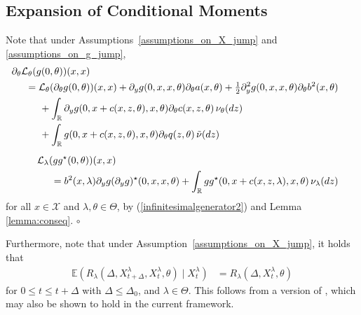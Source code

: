\documentclass[11pt,a4paper]{article}
\newcommand{\EE}{{\mathbb E}}
\newcommand{\RR}{{\mathbb R}}
\renewcommand{\ll}{{\mathcal{L}}}
\newcommand{\xx}{{\mathcal{X}}}
\newcommand{\cqed}{{\leavevmode \unskip \penalty9999 \hbox{} \nobreak \hfill \quad \hbox{$\circ$}}}
\numberwithin{equation}{section}
\numberwithin{theorem}{section}
\begin{document}
\subsection{Expansion of Conditional Moments}\label{exconmo}
%
\begin{remark}
Note that under Assumptions~\ref{assumptions_on_X_jump} and
\ref{assumptions_on_g_jump},
\begin{align*}
\begin{split}
& \hspace{-5mm} \partial_\theta \ll_\theta(g(0,\theta))(x,x) \\
&= \ll_\theta(\partial_{\theta} g(0,\theta))(x,x) + \partial_y
g(0,x,x, \theta)\partial_\theta  a(x, \theta) + \tfrac{1}{2}\partial^2_y g(0,x,x, \theta)\partial_\theta b^2(x,
\theta)\\
&\hspace{5mm} + \int_\RR \partial_y g(0,x+c(x,z,
\theta), x, \theta) \partial_\theta c(x,z, \theta)\, \nu_\theta(dz) \\
&\hspace{5mm} + \int_\RR g(0,x+c(x,z,
\theta), x, \theta)\partial_\theta q(z,\theta)\, \tilde{\nu}(dz)
\end{split}\\[0.5em]
\begin{split}
&\hspace{-5mm} \ll_\lambda(gg^\star (0,\theta))(x,x) \\
&= b^2(x, \lambda) \partial_y g(\partial_y g)^\star (0,x,x,
  \theta) + \int_\RR gg^\star  (0,x+c(x,z, \lambda),x, \theta) \, \nu_\lambda(dz)
\end{split}
\end{align*}
%
for all $x\in\xx$ and $\lambda, \theta \in
\Theta$, by (\ref{infinitesimalgenerator2}) and Lemma
\ref{lemma:conseq}. \cqed
\label{re:jump_gen_presentation}
\end{remark}
%
Furthermore, note that under
Assumption~\ref{assumptions_on_X_jump}, it holds that
\begin{align}
\EE\left( R_{\lambda}(\Delta, X^\lambda_{t+\Delta}, X^\lambda_t,
      \theta) \mid X^\lambda_{t}\right) &=R_{\lambda}(\Delta, X^\lambda_{t}, \theta)
\label{eqn:expectation_remainder_jump}
\end{align}
%
for $0\leq t
\leq t+\Delta$ with $\Delta \leq \Delta_0$, and $\lambda
\in \Theta$. This follows from a version of \cite[Proposition 3.1]{shimizu2006}, which may also be shown to hold in the current framework.
%
\end{document}
